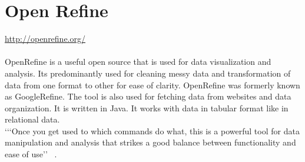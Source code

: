 \section{Open Refine}
\url{http://openrefine.org/} \\
\\
OpenRefine is a useful open source that is used for data visualization and analysis. 
Its predominantly used for cleaning messy data and transformation of data from one format to other for ease of clarity.
OpenRefine was formerly known as GoogleRefine. The tool is also used for fetching data from websites and data organization.
It is written in Java. It works with data in tabular format like in relational data.\\
`‘‘Once you get used to which commands do what, this is a powerful tool for data manipulation and analysis
that strikes a good balance between functionality and ease of use’’ ~\cite{hid-sp18-417-openrefine}.

